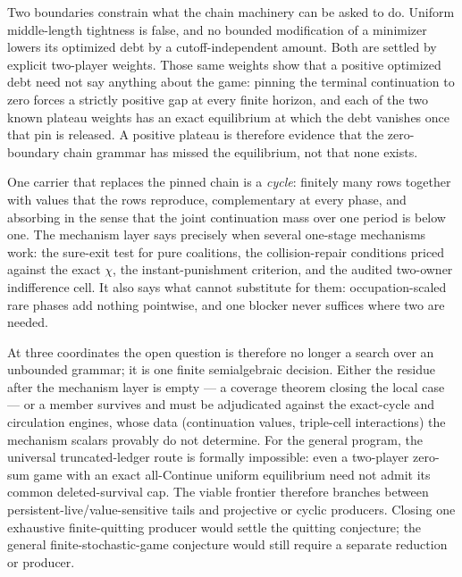 \documentclass[11pt]{article}
\begin{document}
Two boundaries constrain what the chain machinery can be asked to do.  Uniform
middle-length tightness is false, and no bounded modification of a minimizer
lowers its optimized debt by a cutoff-independent amount.  Both are settled by
explicit two-player weights.  Those same weights show that a positive optimized
debt need not say anything about the game: pinning the terminal continuation to
zero forces a strictly positive gap at every finite horizon, and each of the two
known plateau weights has an exact equilibrium at which the debt vanishes once
that pin is released.  A positive plateau is therefore evidence that the
zero-boundary chain grammar has missed the equilibrium, not that none exists.

One carrier that replaces the pinned chain is a \emph{cycle}: finitely many rows
together with values that the rows reproduce, complementary at every phase, and
absorbing in the sense that the joint continuation mass over one period is below
one.  The mechanism layer says precisely when several one-stage mechanisms work: the
sure-exit test for pure coalitions, the collision-repair conditions priced
against the exact \(\chi\), the instant-punishment criterion, and the audited
two-owner indifference cell.  It also says
what cannot substitute for them: occupation-scaled rare phases add nothing
pointwise, and one blocker never suffices where two are needed.

At three coordinates the open question is therefore no longer a search over an
unbounded grammar; it is one finite semialgebraic decision.  Either the residue
after the mechanism layer is empty --- a coverage theorem closing the local
case --- or a member survives and must be adjudicated against the exact-cycle
and circulation engines, whose data (continuation values, triple-cell
interactions) the mechanism scalars provably do not determine.  For the general
program, the universal truncated-ledger route is formally impossible: even a
two-player zero-sum game with an exact all-Continue uniform equilibrium need
not admit its common deleted-survival cap.  The viable frontier therefore
branches between persistent-live/value-sensitive tails and projective or cyclic
producers.  Closing one exhaustive finite-quitting producer would settle the
quitting conjecture; the general finite-stochastic-game conjecture would still
require a separate reduction or producer.
\end{document}
